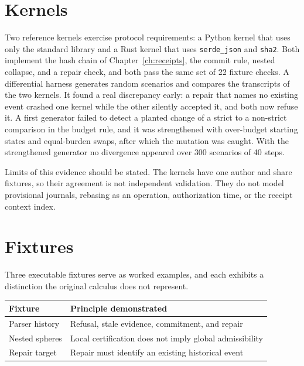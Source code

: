 \documentclass[12pt,oneside,openany]{book}
\theoremstyle{spherepop}
\theoremstyle{remarkstyle}
\begin{document}
\section{Kernels}

Two reference kernels exercise protocol requirements: a Python kernel that uses only the standard library and a Rust kernel that uses \texttt{serde\_json} and \texttt{sha2}. Both implement the hash chain of Chapter~\ref{ch:receipts}, the commit rule, nested collapse, and a repair check, and both pass the same set of 22 fixture checks. A differential harness generates random scenarios and compares the transcripts of the two kernels. It found a real discrepancy early: a repair that names no existing event crashed one kernel while the other silently accepted it, and both now refuse it. A first generator failed to detect a planted change of a strict to a non-strict comparison in the budget rule, and it was strengthened with over-budget starting states and equal-burden swaps, after which the mutation was caught. With the strengthened generator no divergence appeared over 300 scenarios of 40 steps.

Limits of this evidence should be stated. The kernels have one author and share fixtures, so their agreement is not independent validation. They do not model provisional journals, rebasing as an operation, authorization time, or the receipt context index.

\section{Fixtures}

Three executable fixtures serve as worked examples, and each exhibits a distinction the original calculus does not represent.

\begin{center}
\small
\begin{tabular}{p{}p{}}
\toprule
Fixture & Principle demonstrated \\
\midrule
Parser history & Refusal, stale evidence, commitment, and repair \\
Nested spheres & Local certification does not imply global admissibility \\
Repair target & Repair must identify an existing historical event \\
\bottomrule
\end{tabular}
\end{center}
\end{document}
